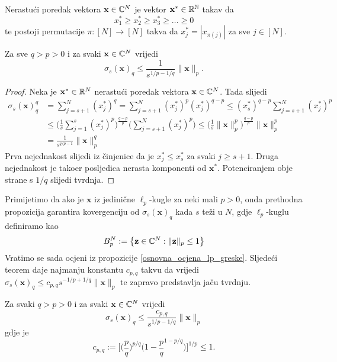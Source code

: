 \documentclass[a4paper,twoside,12pt]{memoir} %
\newcommand{\vect}[1]{\mathbf{#1}}
\renewcommand{\vec}{\vect}
\begin{document}
\begin{defn}
    Nerastu\'ci poredak vektora $\vec{x} \in \C^{N}$ je vektor $\vec{x}^* \in \R^{\N}$ takav da
    $$x^*_1 \geq x^*_2 \geq x^*_3 \geq \dots \geq 0$$
    te postoji permutacije $\pi : [N]\rightarrow[N]$ takva da $x^*_j=|x_{\pi(j)}|$ za sve $j\in [N]$.
\end{defn}
\begin{prop}\label{osnovna_ocjena_lp_greske}
    Za sve $q > p > 0$ i za svaki $\vec{x}\in \C^{N}$ vrijedi
    $$\sigma_s(\vec{x})_q \leq \frac{1}{s^{1/p - 1/q}}\|\vec{x}\|_p.$$
\end{prop}
\begin{proof}
    Neka je $\vec{x}^* \in \R^N$ nerastu\'ci poredak vektora $\vec{x}\in\C^N$. Tada slijedi
    \begin{equation*}
    \begin{split} 
        \sigma_s(\vec{x})_q^q &= \sum_{j=s+1}^{N}(x_j^*)^q=\sum_{j=s+1}^{N}(x_j^*)^p(x_j^*)^{q-p} \leq (x_s^*)^{q-p} \sum_{j=s+1}^{N}(x_j^*)^p \\ & \leq \bigg(\frac{1}{s}\sum_{j=1}^{s}(x_j^*)^p\bigg)^{\frac{q-p}{p}}\bigg( \sum_{j=s+1}^N(x_j^*)^p\bigg) \leq \bigg( \frac{1}{s} \|\vec{x}\|_p^p \bigg)^{\frac{q-p}{p}}\|\vec{x}\|_p^p \\ & = \frac{1}{s^{q/p-1}}\|\vec{x}\|_p^q
    \end{split}
    \end{equation*}
    Prva nejednakost slijedi iz \v{c}injenice da je $x_j^* \leq x_s^*$ za svaki $j \geq s+1$. Druga nejednakost je tako\dj er posljedica nerasta komponenti od $\vec{x}^*$. Potenciranjem obje strane s $1/q$ slijedi tvrdnja.
\end{proof}
Primijetimo da ako je $\vec{x}$ iz jedini\v{c}ne $\ell_p$-kugle za neki mali $p>0$, onda prethodna propozicija garantira kovergenciju od $\sigma_s(\vec{x})_q$ kada $s$ te\v{z}i u $N$, gdje $\ell_p$-kuglu definiramo kao
$$B_p^N := \big\{ \vec{z} \in \C^N : \|\vec{z}\|_p \leq 1\big\}$$
Vratimo se sada ocjeni iz propozicije \ref{osnovna_ocjena_lp_greske}. Sljede\'ci teorem daje najmanju konstantu $c_{p,q}$ takvu da vrijedi $\sigma_s(\vec{x})_q\leq c_{p,q}s^{-1/p+1/q}\|\vec{x}\|_p$ te zapravo predstavlja ja\v{c}u tvrdnju.
\begin{thm}\label{tm:2:5}
    Za svaki $q > p > 0$ i za svaki $\vec{x}\in\C^N$ vrijedi
    \begin{equation*}
    \sigma_s(\vec{x})_q \leq \frac{c_{p,q}}{s^{1/p - 1/q}}\|\vec{x}\|_p
    \end{equation*}
    gdje je
    $$
    c_{p,q} := \bigg[ \bigg(\frac{p}{q}\bigg)^{p/q}\bigg( 1-\frac{p}{q}^{1-p/q}\bigg) \bigg]^{1/p}\leq1.
    $$
\end{thm}
\end{document}
